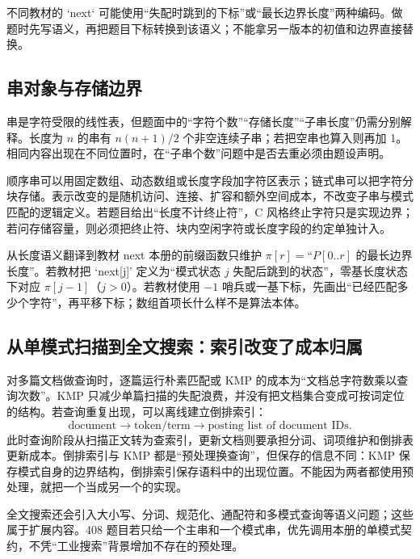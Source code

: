 \documentclass[UTF8,fontset=none,11pt,a4paper]{ctexart}
\begin{document}
不同教材的 `next` 可能使用“失配时跳到的下标”或“最长边界长度”两种编码。做题时先写语义，再把题目下标转换到该语义；不能拿另一版本的初值和边界直接替换。

\subsection{串对象与存储边界}
串是字符受限的线性表，但题面中的“字符个数”“存储长度”“子串长度”仍需分别解释。长度为 $n$ 的串有 $n(n+1)/2$ 个非空连续子串；若把空串也算入则再加 1。相同内容出现在不同位置时，在“子串个数”问题中是否去重必须由题设声明。

顺序串可以用固定数组、动态数组或长度字段加字符区表示；链式串可以把字符分块存储。表示改变的是随机访问、连接、扩容和额外空间成本，不改变子串与模式匹配的逻辑定义。若题目给出“长度不计终止符”，C 风格终止字符只是实现边界；若问存储容量，则必须把终止符、块内空闲字符或长度字段的约定单独计入。

\begin{methodbox}{从长度语义翻译到教材 next}
本册的前缀函数只维护 $\pi[r]=$“$P[0..r]$ 的最长边界长度”。若教材把 `next[j]' 定义为“模式状态 $j$ 失配后跳到的状态”，零基长度状态下对应 $\pi[j-1]$（$j>0$）。若教材使用 $-1$ 哨兵或一基下标，先画出“已经匹配多少个字符”，再平移下标；数组首项长什么样不是算法本体。
\end{methodbox}

\subsection{从单模式扫描到全文搜索：索引改变了成本归属}
对多篇文档做查询时，逐篇运行朴素匹配或 KMP 的成本为“文档总字符数乘以查询次数”。KMP 只减少单篇扫描的失配浪费，并没有把文档集合变成可按词定位的结构。若查询重复出现，可以离线建立倒排索引：
\[
\text{document}\to\text{token/term}\to\text{posting list of document IDs}.
\]
此时查询阶段从扫描正文转为查索引，更新文档则要承担分词、词项维护和倒排表更新成本。倒排索引与 KMP 都是“预处理换查询”，但保存的信息不同：KMP 保存模式自身的边界结构，倒排索引保存语料中的出现位置。不能因为两者都使用预处理，就把一个当成另一个的实现。

全文搜索还会引入大小写、分词、规范化、通配符和多模式查询等语义问题；这些属于扩展内容。408 题目若只给一个主串和一个模式串，优先调用本册的单模式契约，不凭“工业搜索”背景增加不存在的预处理。
\end{document}
